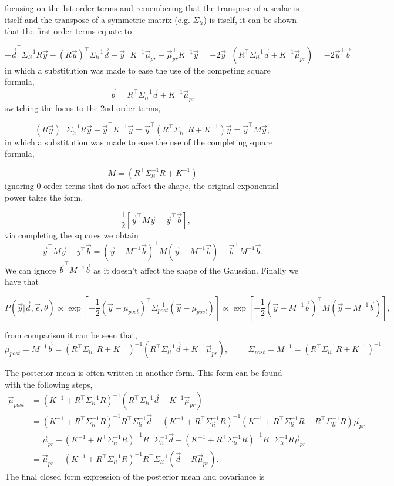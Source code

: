 focusing on the 1st order terms and remembering that the transpose of a scalar is itself and the transpose of a symmetric matrix (e.g. $\Sigma_{li}$) is itself, it can be shown that the first order terms equate to

$$
- \vec d^\top \Sigma_{li}^{-1} R\vec y - (R\vec y)^\top \Sigma_{li}^{-1} \vec d - \vec y^\top K^{-1} \vec \mu_{pr} - \vec \mu_{pr}^\top K^{-1} \vec y = -2 \vec y^\top ( R^{\top} \Sigma_{li}^{-1}\vec d + K^{-1} \vec \mu_{pr}) =-2 \vec y^\top \vec b
$$
in which a substitution was made to ease the use of the competing square formula, 
$$
\vec b = R^{\top} \Sigma_{li}^{-1}\vec d + K^{-1} \vec \mu_{pr}
$$
switching the focus to the 2nd order terms,

$$
(R\vec y)^\top \Sigma_{li}^{-1} R\vec y + \vec y^\top K^{-1} \vec y = \vec y^\top (R^\top \Sigma_{li}^{-1} R + K^{-1}) \vec y = \vec y^\top M \vec y,
$$
in which a substitution was made to ease the use of the completing square formula,

$$
M = (R^\top \Sigma_{li}^{-1} R + K^{-1})
$$
ignoring 0 order terms that do not affect the shape, the original exponential power takes the form,

$$
 -\frac{1}{2}\left[\vec y^\top M \vec y - \vec y^\top \vec b \right],
$$
via completing the squares we obtain
$$
\vec y^\top M \vec y - y^\top \vec b = (\vec y - M^{-1}\vec b)^\top M (\vec y - M^{-1} \vec b) - \vec b^\top M^{-1} \vec b.
$$
We can ignore $\vec b^\top M^{-1} \vec b$ as it doesn't affect the shape of the Gaussian. Finally we have that 

$$
P(\vec{y}|\vec{d},\vec\epsilon, \theta) \propto \exp \left[ -\frac{1}{2}(\vec y - \mu_{post})^{\top} \Sigma^{-1}_{post} (\vec y - \mu_{post}) \right] \propto \exp \left[ -\frac{1}{2} (\vec y - M^{-1}\vec b)^\top M (\vec y - M^{-1} \vec b)\right],
$$

from comparison it can be seen that,
$$
\mu_{post} = M^{-1} \vec b = \left(R^\top \Sigma_{li}^{-1} R + K^{-1}\right)^{-1} \left(R^{\top} \Sigma_{li}^{-1}\vec d + K^{-1} \vec \mu_{pr}\right), \hspace{1cm} \Sigma_{post} = M^{-1} = \left(R^\top \Sigma_{li}^{-1} R + K^{-1}\right)^{-1}
$$

The posterior mean is often written in another form. This form can be found with the following steps,
$$
\begin{aligned}
\vec{\mu}_{post} &= (K^{-1} + R^{\top} \Sigma_{li}^{-1} R)^{-1}(R^{\top} \Sigma_{li}^{-1} \vec{d} + K^{-1} \vec{\mu}_{pr}) \\
&= (K^{-1} + R^{\top} \Sigma_{li}^{-1} R)^{-1} R^{\top} \Sigma_{li}^{-1} \vec{d} + (K^{-1} + R^{\top} \Sigma_{li}^{-1} R)^{-1} (K^{-1} + R^{\top} \Sigma_{li}^{-1} R - R^{\top} \Sigma_{li}^{-1} R) \vec{\mu}_{pr} \\
&= \vec{\mu}_{pr} + (K^{-1} + R^{\top} \Sigma_{li}^{-1} R)^{-1} R^{\top} \Sigma_{li}^{-1} \vec{d} - (K^{-1} + R^{\top} \Sigma_{li}^{-1} R)^{-1} R^{\top} \Sigma_{li}^{-1} R \vec{\mu}_{pr} \\
&= \vec{\mu}_{pr} + (K^{-1} + R^{\top} \Sigma_{li}^{-1} R)^{-1} R^{\top} \Sigma_{li}^{-1} (\vec{d} - R \vec{\mu}_{pr}).
\end{aligned}
$$
The final closed form expression of the posterior mean and covariance is

